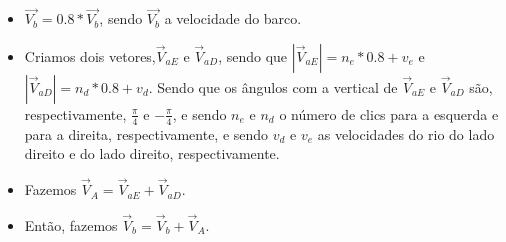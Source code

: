 \documentclass[11pt]{article}
\begin{document}
\begin{itemize}

\item  $\vec{V_b} = 0.8 * \vec{V_b}$, sendo $\vec{V_b}$ a velocidade do barco.

\item Criamos dois vetores,$\vec{V}_{aE}$ e $\vec{V}_{aD}$, sendo que $|\vec{V}_{aE}| = n_e*0.8 + v_e$ e $|\vec{V}_{aD}| = n_d*0.8 + v_d$. Sendo que os ângulos com a vertical de $\vec{V}_{aE}$ e $\vec{V}_{aD}$ são, respectivamente, $\frac{\pi}{4}$ e $-\frac{\pi}{4}$, e sendo $n_e$ e $n_d$ o número de clics para a esquerda e para a direita, respectivamente, e sendo $v_d$ e $v_e$ as velocidades do rio do lado direito e do lado direito, respectivamente.

\item Fazemos $\vec{V}_A = \vec{V}_{aE} + \vec{V}_{aD}$.

\item Então, fazemos $\vec{V}_b = \vec{V}_b + \vec{V}_A$.



\end{itemize}
\end{document}
